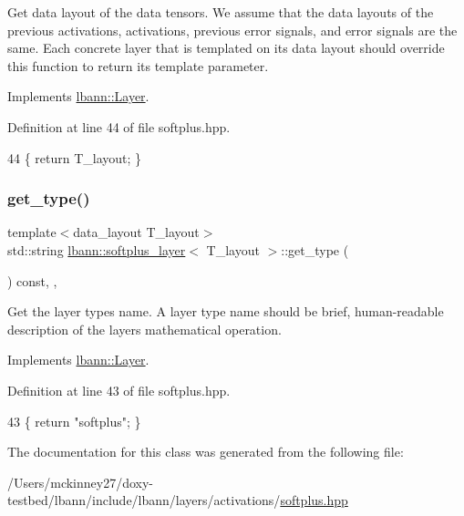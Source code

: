 Get data layout of the data tensors. We assume that the data layouts of the previous activations, activations, previous error signals, and error signals are the same. Each concrete layer that is templated on its data layout should override this function to return its template parameter. 

Implements \hyperlink{classlbann_1_1Layer_a5dfb66e81fc085997402a5e2241316bd}{lbann\+::\+Layer}.



Definition at line 44 of file softplus.\+hpp.


\begin{DoxyCode}
44 \{ \textcolor{keywordflow}{return} T\_layout; \}
\end{DoxyCode}
\mbox{\label{classlbann_1_1softplus__layer_ae95163214d6129880586b11d2de407a1}} 
\subsubsection{\texorpdfstring{get\+\_\+type()}{get\_type()}}
{\footnotesize\ttfamily template$<$data\+\_\+layout T\+\_\+layout$>$ \\
std\+::string \hyperlink{classlbann_1_1softplus__layer}{lbann\+::softplus\+\_\+layer}$<$ T\+\_\+layout $>$\+::get\+\_\+type (\begin{DoxyParamCaption}{ }\end{DoxyParamCaption}) const\hspace{0.3cm}{\ttfamily [inline]}, {\ttfamily [override]}, {\ttfamily [virtual]}}

Get the layer type\textquotesingle{}s name. A layer type name should be brief, human-\/readable description of the layer\textquotesingle{}s mathematical operation. 

Implements \hyperlink{classlbann_1_1Layer_a0fa0ea9160b490c151c0a17fde4f7239}{lbann\+::\+Layer}.



Definition at line 43 of file softplus.\+hpp.


\begin{DoxyCode}
43 \{ \textcolor{keywordflow}{return} \textcolor{stringliteral}{"softplus"}; \}
\end{DoxyCode}


The documentation for this class was generated from the following file\+:\begin{DoxyCompactItemize}
\item 
/\+Users/mckinney27/doxy-\/testbed/lbann/include/lbann/layers/activations/\hyperlink{softplus_8hpp}{softplus.\+hpp}\end{DoxyCompactItemize}
